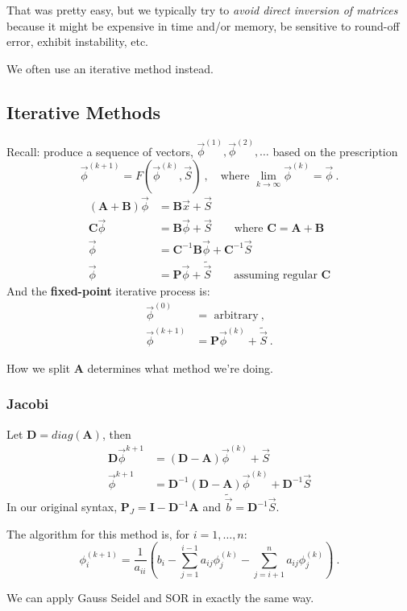 \documentclass[12pt]{article}
\newcommand{\ve}[1]{\ensuremath{\mathbf{#1}}}
\begin{document}
That was pretty easy, but we typically try to \textit{avoid direct inversion of matrices} because it might be expensive in time and/or memory, be sensitive to round-off error, exhibit instability, etc.

We often use an iterative method instead. 


\subsection*{Iterative Methods}

Recall: produce a sequence of vectors, $\vec{\phi}^{(1)}, \vec{\phi}^{(2)}, \dots$ based on the prescription
  \[\vec{\phi}^{(k+1)} = F(\vec{\phi}^{(k)}, \vec{S})\:, \quad \text{where } \displaystyle \lim_{k \rightarrow \infty} \vec{\phi}^{(k)} = \vec{\phi}\:.\] 
%
\begin{align}
(\ve{A} + \ve{B}) \vec{\phi} &= \ve{B}\vec{x} + \vec{S} \nonumber \\
%
\ve{C} \vec{\phi} &= \ve{B}\vec{\phi} + \vec{S} 
\qquad\text{where } \ve{C} = \ve{A} + \ve{B} \nonumber \\
%
\vec{\phi} &= \ve{C}^{-1} \ve{B}\vec{\phi} + \ve{C}^{-1} \vec{S} 
\nonumber \\
%
\vec{\phi} &= \ve{P}\vec{\phi} + \tilde{\vec{S}}  
\qquad\text{assuming regular } \ve{C}\nonumber
\end{align}
%
And the \textbf{fixed-point} iterative process is:
\begin{align}
\vec{\phi}^{(0)} &= \text{ arbitrary}\:,\nonumber \\
\vec{\phi}^{(k+1)} &= \ve{P}\vec{\phi}^{(k)} + \tilde{\vec{S}}\:. \nonumber
\end{align}

How we split $\ve{A}$ determines what method we're doing.

\subsubsection*{Jacobi}

Let $\ve{D} = diag(\ve{A})$, then
\begin{align}
\ve{D} \vec{\phi}^{k+1} &= (\ve{D} - \ve{A})\vec{\phi}^{(k)} + \vec{S} \nonumber \\
%
\vec{\phi}^{k+1} &= \ve{D}^{-1}(\ve{D} - \ve{A})\vec{\phi}^{(k)} + \ve{D}^{-1}\vec{S} \nonumber
\end{align}
%
In our original syntax, $\ve{P}_J = \ve{I} -  \ve{D}^{-1}\ve{A}$ and $\tilde{\vec{b}} =\ve{D}^{-1}\vec{S}$.

The algorithm for this method is, for $i = 1, \dots, n$:
\[ \phi^{(k+1)}_i = \frac{1}{a_{ii}}(b_i - \sum_{j=1}^{i-1} a_{ij} \phi_j^{(k)} - \sum_{j=i+1}^{n} a_{ij} \phi_j^{(k)})\:.\]

We can apply Gauss Seidel and SOR in exactly the same way. 




%
% 
\end{document}

